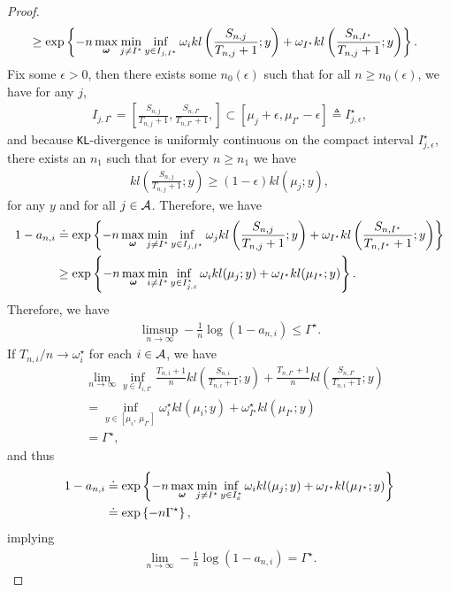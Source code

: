 \begin{proof}
\begin{align*}
&\geq \exp\left\{ - n \max_{{\boldsymbol \omega}} \min_{j \neq I^\star} \inf_{y \in I_{j,I^\star} } \omega_i kl\left (\frac{S_{n,j}}{T_{n,j}+1}; y\right) + \omega_{I^\star} kl \left(\frac{S_{n,I^\star}}{T_{n,j}+1} ; y\right) \right\}.
\end{align*}
Fix some $\epsilon > 0$, then there exists some $n_0(\epsilon)$ such that for all $n \geq n_0(\epsilon)$, we have for any $j$, 
\begin{align*}
I_{j,I^\star} = \left[\frac{S_{n,j}}{T_{n,j} + 1}, \frac{S_{n,I^\star}}{T_{n,I^\star} + 1}, \right] \subset \left[ \mu_j + \epsilon, \mu_{I^\star} - \epsilon \right] \triangleq I^\star_{j,\epsilon},  
\end{align*}
and because \texttt{KL}-divergence is uniformly continuous on the compact interval $I^\star_{j,\epsilon}$, there exists an $n_1$ such that for every $n \geq n_1$ we have 
\begin{align*}
kl\left(\frac{S_{n,j}}{T_{n,j} + 1}; y  \right) \geq (1-\epsilon) kl \left( \mu_j ; y \right),
\end{align*}
for any $y$ and for all $j \in \mathcal{A}$. Therefore, we have
\begin{align*}
1 - a_{n,i} &\doteq \exp\left\{ - n \max_{{\boldsymbol \omega}} \min_{j \neq I^\star} \inf_{y \in I_{j,I^\star} } \omega_j kl\left(\frac{S_{n,j}}{T_{n,j}+1}; y\right) + \omega_{I^\star} kl\left(\frac{S_{n,I^\star}}{T_{n,I^\star}+1} ; y\right) \right\}\\
&\geq \exp\left\{ - n \max_{{\boldsymbol \omega}} \min_{i \neq I^\star} \inf_{y \in I^\star_{j,\varepsilon}} \omega_i kl (\mu_j; y) + \omega_{I^\star} kl (\mu_{I^\star} ; y) \right\}.
\end{align*}
Therefore, we have
\begin{align*}
\limsup_{n \rightarrow \infty} - \frac{1}{n} \log (1 - a_{n,i}) \leq \Gamma^\star.
\end{align*}
If $T_{n,i} / n \rightarrow \omega_i^\star$ for each $i \in \mathcal{A}$, we have
\begin{align*}
    &\lim_{n \rightarrow \infty} \inf_{y \in I_{i,I^\star} } \frac{T_{n,i} + 1}{n} kl\left(\frac{S_{n,i}}{T_{n,i}+1}; y\right)+ \frac{T_{n,I^\star}  + 1}{n} kl\left(\frac{S_{n,I^\star}}{T_{n,i}+1} ; y\right)\\
    &= \inf_{y \in \left[ \mu_i, \, \mu_{I^\star} \right] } \omega_i^\star kl (\mu_{i}; y) + \omega_{I^\star}^\star kl (\mu_{I^\star} ; y) \\
    &= \Gamma^\star,
\end{align*}
and thus
\begin{align*}
1 - a_{n,i} &\doteq \exp\left\{ - n \max_{{\boldsymbol \omega}} \min_{j \neq I^\star} \inf_{y \in I^\star_\varepsilon} \omega_i kl (\mu_j; y) + \omega_{I^\star} kl (\mu_{I^\star} ; y) \right\} \\
&\doteq \exp\left\{ - n \Gamma^\star \right\},
\end{align*}
implying
\begin{align*}
\lim_{n \rightarrow \infty} - \frac{1}{n} \log \left( 1 - a_{n,i} \right) = \Gamma^\star.
\end{align*}


\end{proof}
